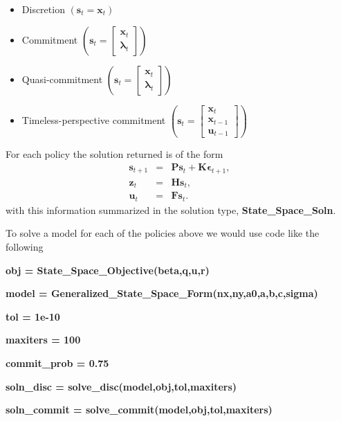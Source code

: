 \documentclass[thmsa,notitlepage,11pt]{article}
\begin{document}
\begin{itemize}
\item Discretion $\left( \mathbf{s}_{t}=\mathbf{x}_{t}\right) $

\item Commitment $\left( \mathbf{s}_{t}=\left[ 
\begin{array}{c}
\mathbf{x}_{t} \\ 
\mathbf{\lambda }_{t}%
\end{array}%
\right] \right) $

\item Quasi-commitment $\left( \mathbf{s}_{t}=\left[ 
\begin{array}{c}
\mathbf{x}_{t} \\ 
\mathbf{\lambda }_{t}%
\end{array}%
\right] \right) $

\item Timeless-perspective commitment $\left( \mathbf{s}_{t}=\left[ 
\begin{array}{c}
\mathbf{x}_{t} \\ 
\mathbf{x}_{t-1} \\ 
\mathbf{u}_{t-1}%
\end{array}%
\right] \right) $
\end{itemize}

For each policy the solution returned is of the form%
\begin{eqnarray*}
\mathbf{s}_{t+1} &=&\mathbf{Ps}_{t}+\mathbf{K\epsilon }_{t+1}, \\
\mathbf{z}_{t} &=&\mathbf{Hs}_{t}, \\
\mathbf{u}_{t} &=&\mathbf{Fs}_{t}.
\end{eqnarray*}%
with this information summarized in the solution type, \textbf{%
State\_Space\_Soln}.

To solve a model for each of the policies above we would use code like the
following

\bigskip

\textbf{obj = State\_Space\_Objective(beta,q,u,r)}

\textbf{model = Generalized\_State\_Space\_Form(nx,ny,a0,a,b,c,sigma)}

\textbf{tol = 1e-10}

\textbf{maxiters = 100}

\textbf{commit\_prob = 0.75}

\textbf{soln\_disc = solve\_disc(model,obj,tol,maxiters)}

\textbf{soln\_commit = solve\_commit(model,obj,tol,maxiters)}
\end{document}
